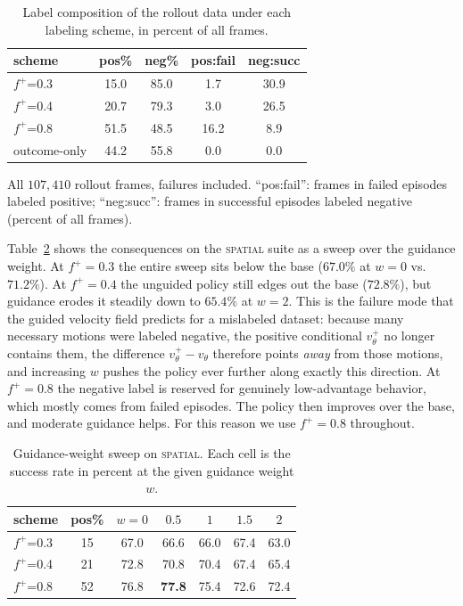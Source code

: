 \documentclass[conference]{IEEEtran}
\newcommand{\pf}{\ensuremath{f^{+}}}   %
\begin{document}
\begin{table}[t]
\caption{Label composition of the rollout data under each labeling scheme, in percent of
all frames.}
\label{tab:labels}
\begin{center}
\begin{tabular}{lcccc}
\toprule
scheme & pos\% & neg\% & pos{:}fail & neg{:}succ \\
\midrule
\pf{}=0.3 & 15.0 & 85.0 & 1.7 & 30.9 \\
\pf{}=0.4 & 20.7 & 79.3 & 3.0 & 26.5 \\
\pf{}=0.8 & 51.5 & 48.5 & 16.2 & 8.9 \\
outcome-only & 44.2 & 55.8 & 0.0 & 0.0 \\
\bottomrule
\end{tabular}
\end{center}
{\footnotesize All $107{,}410$ rollout frames, failures included. ``pos{:}fail'': frames in
failed episodes labeled positive; ``neg{:}succ'': frames in successful episodes labeled
negative (percent of all frames).}
\end{table}

Table~\ref{tab:dose} shows the consequences on the \textsc{spatial} suite as a sweep over
the guidance weight. At $\pf{=}0.3$ the entire sweep sits below the base ($67.0\%$ at
$w{=}0$ vs.\ $71.2\%$). At $\pf{=}0.4$ the unguided policy still edges out the base
($72.8\%$), but guidance erodes it steadily down to $65.4\%$ at $w{=}2$. This is the
failure mode that the guided velocity field predicts for a mislabeled dataset: because many
necessary motions were labeled negative, the positive conditional $v_\theta^{+}$ no longer
contains them, the difference $v_\theta^{+}\!-\!v_\theta$ therefore points \emph{away} from
those motions, and increasing $w$ pushes the policy ever further along exactly this
direction. At $\pf{=}0.8$ the negative label is reserved for genuinely low-advantage
behavior, which mostly comes from failed episodes. The policy then improves over the base,
and moderate guidance helps. For this reason we use $\pf{=}0.8$ throughout.

\begin{table}[t]
\caption{Guidance-weight sweep on \textsc{spatial}. Each cell is the success rate in
percent at the given guidance weight $w$.}
\label{tab:dose}
\begin{center}
\begin{tabular}{lcccccc}
\toprule
scheme & pos\% & $w{=}0$ & $0.5$ & $1$ & $1.5$ & $2$ \\
\midrule
\pf{}=0.3 & 15 & 67.0 & 66.6 & 66.0 & 67.4 & 63.0 \\
\pf{}=0.4 & 21 & 72.8 & 70.8 & 70.4 & 67.4 & 65.4 \\
\pf{}=0.8 & 52 & 76.8 & \textbf{77.8} & 75.4 & 72.6 & 72.4 \\
\bottomrule
\end{tabular}
\end{center}
\end{table}
\end{document}
